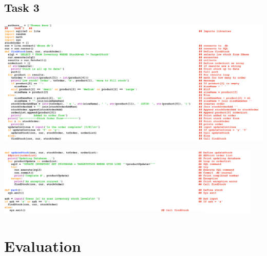 \documentclass[a4paper]{article}
\begin{document}
\subsection{Task 3}
\noindent\includegraphics[width=1\textwidth, left]{task3FINALCODE1.png} \par
\noindent\includegraphics[width=0.955\textwidth, left]{task3FINALCODE2.png} \par


\section{Evaluation}
\end{document}
